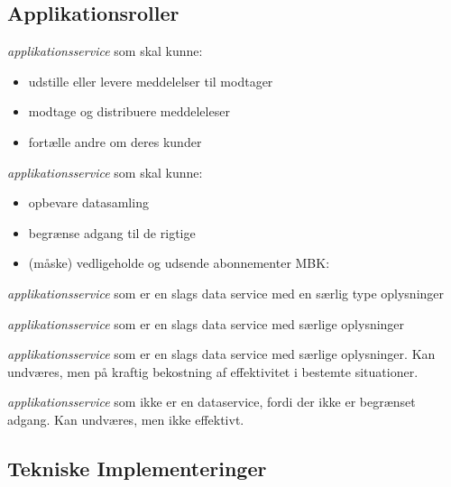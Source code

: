 \subsection{Applikationsroller}\label{applikationsroller}

\begin{description}
\tightlist
\item[eDelivery Service Provider]
\emph{applikationsservice} som skal kunne:
\end{description}

\begin{itemize}
\tightlist
\item
  udstille eller levere meddelelser til modtager
\item
  modtage og distribuere meddeleleser
\item
  fortælle andre om deres kunder
\end{itemize}

\begin{description}
\tightlist
\item[Dataservice]
\emph{applikationsservice} som skal kunne:
\end{description}

\begin{itemize}
\tightlist
\item
  opbevare datasamling
\item
  begrænse adgang til de rigtige
\item
  (måske) vedligeholde og udsende abonnementer MBK:
\end{itemize}

\begin{description}
\tightlist
\item[Kontaktregister]
\emph{applikationsservice} som er en slags data service med en særlig
type oplysninger
\item[Log]
\emph{applikationsservice} som er en slags data service med særlige
oplysninger
\item[Indeks]
\emph{applikationsservice} som er en slags data service med særlige
oplysninger. Kan undværes, men på kraftig bekostning af effektivitet i
bestemte situationer.
\item[Katalog]
\emph{applikationsservice} som ikke er en dataservice, fordi der ikke er
begrænset adgang. Kan undværes, men ikke effektivt.
\end{description}

\subsection{Tekniske Implementeringer}\label{tekniske-implementeringer}

